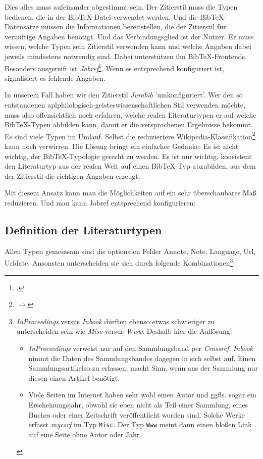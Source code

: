 Dies alles muss aufeinander abgestimmt sein. Der Zitierstil muss die Typen
bedienen, die in der Bib\TeX-Datei verwendet werden. Und die Bib\TeX-Datensätze
müssen die Informationen bereitstellen, die der Zitierstil für vernüftige
Angaben benötigt. Und das Verbindungsglied ist der Nutzer. Er muss wissen,
welche Typen sein Zitierstil verwenden kann und welche Angaben dabei jeweils
mindestens notwendig sind. Dabei unterstützen ihn Bib\TeX-Frontends. Besonders
ausgereift ist \emph{Jabref}\footcite[vgl.][\nopage wp]{Jabref2019a}. Wenn es
entsprechend konfiguriert ist, signalisiert es fehlende Angaben.

In unserem Fall haben wir den Zitierstil \emph{Jurabib} 'umkonfiguriert'.  Wer
den so entstandenen aplphilologisch-geisteswissenschaftlichen Stil verwenden
möchte, muss also offensichtlich noch erfahren, welche realen Literaturtypen er
auf welche Bib\TeX-Typen abbilden kann, damit er die versprochenen Ergebnisse
bekommt. Es sind viele Typen im Umlauf. Selbst die reduziertere
Wikipedia-Klassifikation\footnote{$\rightarrow$
} kann noch verwirren.
Die Lösung bringt ein einfacher Gedanke: Es ist nicht wichtig, der
Bib\TeX-Typologie gerecht zu werden. Es ist nur wichtig, konsistent den
Literaturtyp aus der realen Welt auf einen Bib\TeX-Typ abzubilden, aus dem der
Zitierstil die richtigen Angaben erzeugt.

Mit diesem Ansatz kann man die Möglichkeiten auf ein sehr überschaubares Maß
reduzieren. Und man kann Jabref entsprechend konfigurieren:

\subsection{Definition der Literaturtypen}

Allen Typen gemeinsam sind die optionalen Felder \textsf{Annote,
Note, Language, Url, Urldate}. Ansonsten unterscheiden sie sich durch folgende
Kombinationen\footnote{\emph{InProceedings} versus \emph{Inbook} dürften ebenso
etwas schwieriger zu unterscheiden sein wie \emph{Misc} versus \emph{Www}.
Deshalb hier die Auflösung:
\begin{itemize}
  \item \emph{InProceedings} verweist nur auf den Sammlungsband per
  \emph{Crossref}. \emph{Inbook} nimmt die Daten des Sammlungsbandes dagegen in
  sich selbst auf. Einen Sammlungsartikelso zu erfassen, macht Sinn, wenn aus
  der Sammlung nur diesen einen Artikel benötigt.
  \item Viele Seiten im Internet haben sehr wohl einen Autor und ggfls. sogar
  ein Erscheinungsjahr, obwohl sie eben nicht als Teil einer Sammlung, eines
  Buches oder einer Zeitschrift veröffentlicht worden sind. Solche Werke erfasst
  \emph{mycsrf} im Typ \texttt{Misc}. Der Typ \texttt{Www} meint dann einen bloßen
  Link auf eine Seite ohne Autor oder Jahr.
\end{itemize}}:


